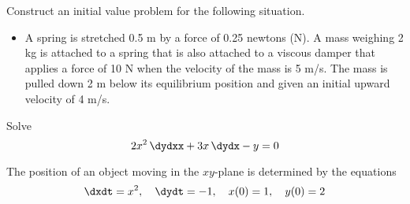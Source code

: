 \documentclass[12pt]{exam}
\begin{document}
    


\newpage

\begin{questions}


\newpage 

    \question[6]  Construct an initial value problem for the following situation. 

    \begin{itemize}
        \item[] A spring is stretched 0.5 m by a force of 0.25 newtons (N). A mass weighing 2 kg is attached to a spring that is also attached to a viscous damper that applies a force of 10 N when the velocity of the mass is 5 m/s. The mass is pulled down 2 m below its equilibrium position and given an initial upward velocity of 4 m/s. 
    \end{itemize}

    \vspace{6cm}

    \question[7] Solve $$2x^2 \, \dydxx + 3x \, \dydx - y =0$$

    \newpage
    
    \question[7] The position of an object moving in the $xy$-plane is determined by the equations
    $$ \dxdt = x^2, \quad \dydt = -1, \quad x(0) = 1, \quad y(0) = 2$$ %
    
    
\end{questions}
\end{document}
